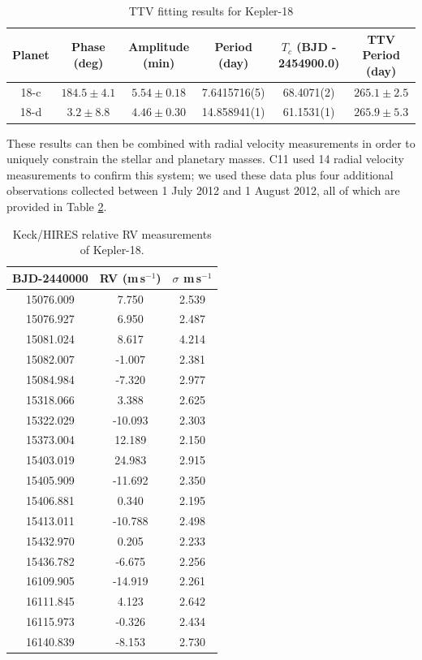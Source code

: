 \begin{table}[hbt!]
\scriptsize
\centering
\begin{tabular}{cccccc}
\hline
Planet & Phase (deg) & Amplitude (min) & Period (day) & $T_c$ (BJD - 2454900.0) &  TTV Period (day)\\
\hline
        18-c & $184.5 \pm 4.1$ & $5.54 \pm 0.18$ & 7.6415716(5) & 68.4071(2) & $265.1 \pm 2.5$ \\
        18-d & $3.2 \pm 8.8$ & $4.46 \pm 0.30$ & 14.858941(1) & 61.1531(1) & $265.9 \pm 5.3$\\
\hline
\end{tabular}
\caption{TTV fitting results for Kepler-18}
\label{TTVdata}
\end{table}


These results can then be combined with radial velocity measurements in order to uniquely constrain the stellar and planetary masses. C11 used 14 radial velocity measurements to confirm this system; we used these data plus four additional observations collected between 1 July 2012 and 1 August 2012, all of which are provided in Table \ref{RVels}.


\begin{table}[hbt!]
\centering
\begin{tabular}{ccc}
\hline
BJD-2440000 & RV (m\,s$^{-1}$)   & $\sigma$ m\,s$^{-1}$ \\
\hline
 15076.009  & 7.750   & 2.539\\
 15076.927  &  6.950  & 2.487\\
 15081.024  &  8.617  & 4.214\\
 15082.007  & -1.007  & 2.381\\
 15084.984  & -7.320  & 2.977\\
 15318.066  &  3.388  & 2.625\\
 15322.029  & -10.093 & 2.303\\
 15373.004  &  12.189 & 2.150\\
 15403.019  &  24.983 & 2.915\\
 15405.909  & -11.692 & 2.350\\
 15406.881  &  0.340  & 2.195\\
 15413.011  & -10.788 & 2.498\\
 15432.970  &  0.205  & 2.233\\
 15436.782  & -6.675  & 2.256\\
 16109.905  & -14.919 & 2.261\\
 16111.845  &  4.123  & 2.642\\
 16115.973  & -0.326  & 2.434\\
 16140.839  & -8.153  & 2.730\\
\hline
\end{tabular}
\caption{Keck/HIRES relative RV measurements of Kepler-18.}
\label{RVels}
\end{table}

